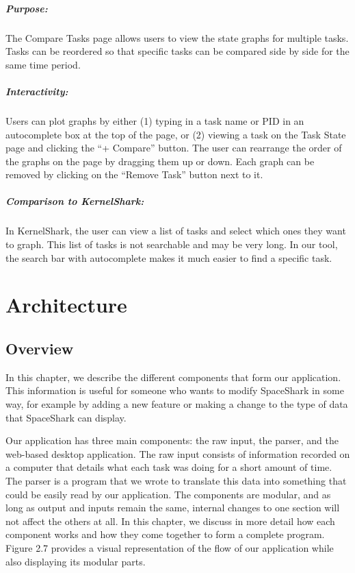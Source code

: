 \documentclass{hmcclinic}
\begin{document}
\paragraph{Purpose:}
The Compare Tasks page allows users to view the state graphs for multiple tasks. Tasks can be reordered so that specific tasks can
be compared side by side for the same time period. 

\paragraph{Interactivity:}
Users can plot graphs by either (1) typing in a task name or PID in an autocomplete box at the top of the page, or
(2) viewing a task on the Task State page and clicking the ``+ Compare''
button. The user can
rearrange the order of the graphs on the page by dragging them up or down. Each
graph can be removed by clicking on the ``Remove Task'' button next to it.
    
\paragraph{Comparison to KernelShark:}
    In KernelShark, the user can view a list of tasks and select which ones they
    want to graph.  This list of tasks is not searchable and may be very long.
    In our tool, the search bar with autocomplete makes it much easier to find a
    specific task.

\chapter{Architecture}

\section{Overview}
In this chapter, we describe the different components that form our application.
This information is useful for someone who wants to modify SpaceShark in some
way, for example by adding a new feature or making a change to the type of data that SpaceShark can display.

  Our application has three main components: the raw input, the parser,
  and the web-based desktop application. The raw input consists of information recorded on a computer that details what each task was doing for a short amount of time. The parser is a program that we wrote to translate this data into something that could be easily read by our application. The components are modular, and
  as long as output and inputs remain the same, internal changes to one section will
  not affect the others at all. In this chapter, we  discuss in more detail how each
  component works and how they come together to form a complete program.
  Figure 2.7 provides a visual representation of the flow of our application
  while also displaying its modular parts.
  
\end{document}
